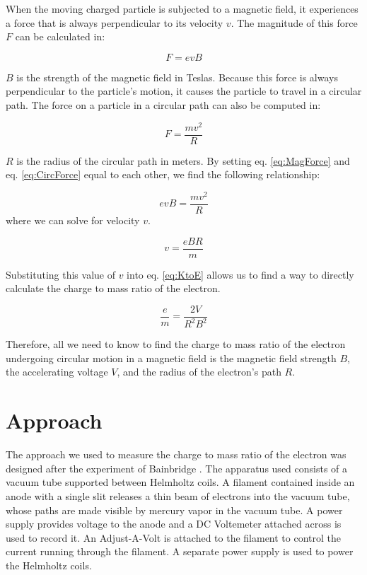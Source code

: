 \documentclass[journal, a4paper]{IEEEtran}
\begin{document}
	When the moving charged particle is subjected to a magnetic field, it experiences a force that is always perpendicular to its velocity $v$. The magnitude of this force $F$ can be calculated in:
    
    \begin{equation} \label{eq:MagForce} %
F=evB
\end{equation}

	$B$ is the strength of the magnetic field in Teslas. Because this force is always perpendicular to the particle's motion, it causes the particle to travel in a circular path. The force on a particle in a circular path can also be computed in:

	\begin{equation} \label{eq:CircForce} %
F=\frac{mv^2}{R}
\end{equation}

	$R$ is the radius of the circular path in meters. By setting eq. \ref{eq:MagForce} and eq. \ref{eq:CircForce} equal to each other, we find the following relationship:
    
    \begin{equation} \label{eq:MagtoCirc} %
evB=\frac{mv^2}{R}
\end{equation}
where we can solve for velocity $v$.
    
    \begin{equation} \label{eq:velocity} %
v=\frac{eBR}{m}
\end{equation}

	Substituting this value of $v$ into eq. \ref{eq:KtoE} allows us to find a way to directly calculate the charge to mass ratio of the electron.

\begin{equation} \label{eq:ratio} %
\frac{e}{m}=\frac{2V}{R^2B^2}
\end{equation}

	Therefore, all we need to know to find the charge to mass ratio of the electron undergoing circular motion in a magnetic field is the magnetic field strength $B$, the accelerating voltage $V$, and the radius of the electron's path $R$.

\section{Approach}
	The approach we used to measure the charge to mass ratio of the electron was designed after the experiment of Bainbridge \cite{Romblom}. The apparatus used consists of a vacuum tube supported between Helmholtz coils. A filament contained inside an anode with a single slit releases a thin beam of electrons into the vacuum tube, whose paths are made visible by mercury vapor in the vacuum tube. A power supply provides voltage to the anode and a DC Voltemeter attached across is used to record it. An Adjust-A-Volt is attached to the filament to control the current running through the filament. A separate power supply is used to power the Helmholtz coils.
    
\end{document}
